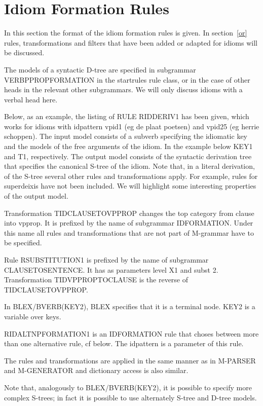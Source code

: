 \section{Idiom Formation Rules}
\label{idform}

In this section the format of the idiom formation rules is given.
In section~\ref{or} rules, transformations and filters that have been added or
adapted for idioms will be discussed. 

The models of a syntactic D-tree are specified in subgrammar VERBPPROPFORMATION
in the startrules rule class, or in the case of other heads in the relevant
other subgrammars. We will only discuss idioms with a verbal head here.


Below, as an example, the listing of RULE RIDDERIV1 has been given, which works
for idioms with idpattern vpid1 (eg de plaat poetsen) and vpid25 (eg herrie
schoppen). The input model consists of a subverb specifying the idiomatic key
and the models of the free arguments of the idiom. In the example below KEY1
and T1, respectively. The output model consists of the syntactic derivation
tree that specifies the canonical S-tree of the idiom. Note that, in a literal
derivation, of the S-tree several other rules and transformations apply. For
example, rules for superdeixis have not been included. We will highlight some 
interesting properties of the output model.

Transformation TIDCLAUSETOVPPROP changes the top category from clause into
vpprop. It is prefixed by the name of subgrammar IDFORMATION. Under this name
all rules and transformations that are not part of M-grammar have to be
specified.
 
Rule RSUBSTITUTION1 is prefixed by the name of subgrammar CLAUSETOSENTENCE. It 
has as parameters level X1 and subst 2. Transformation TIDVPPROPTOCLAUSE is 
the reverse of TIDCLAUSETOVPPROP.

In BLEX/BVERB(KEY2), BLEX specifies that it is a terminal node. KEY2 is a
variable over keys. 

RIDALTNPFORMATION1 is an IDFORMATION rule that choses between more than one
alternative rule, cf below. The idpattern is a parameter of this rule. 

The rules and transformations are applied in the same manner as in M-PARSER and 
M-GENERATOR and dictionary access is also similar. 

Note that, analogously to BLEX/BVERB(KEY2), it is possible to specify more 
complex S-trees; in fact it is possible to use alternately S-tree and D-tree 
models.

